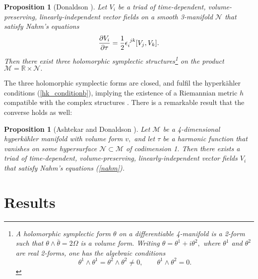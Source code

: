 \documentclass[a4paper,12pt, onecolumn, notitlepage]{article}
\newtheorem{prop}[thm]{Proposition}
\theoremstyle{definition}
\theoremstyle{remark}
\newcommand{\e}{\epsilon}
\newcommand{\ddt}[1]{\frac{\partial #1}{\partial \tau}}
\newcommand{\HK}{hyperk\"ahler }
\newcommand{\R}{\mathbb{R}}
\begin{document}
\begin{prop}[Donaldson \cite{donaldson}]
	Let $V_{i}$ be a triad of time-dependent, volume-preserving, linearly-independent vector fields on a smooth 3-manifold $\mathcal{N}$ that satisfy Nahm's equations
	$$\ddt{V_{i}} = \frac{1}{2}\e\indices{_i^j^k}[V_{j},V_{k}].
	$$
	Then there exist three holomorphic symplectic structures\footnote{A \emph{holomorphic symplectic form} $\theta$ on a differentiable 4-manifold is a 2-form such that $\theta\wedge\bar{\theta}=2\Omega$ is a volume form. Writing $\theta = \theta^{1} + i\theta^{2},$ where $\theta^{1}$ and $\theta^{2}$ are real 2-forms, one has the algebraic conditions
		\begin{equation*}
		\theta^{1}\wedge\theta^{1}=\theta^{2}\wedge\theta^{2}\neq 0,\qquad \theta^{1}\wedge \theta^{2}=0.
		\end{equation*}}
	 on the product $\mathcal{M}=\R\times\mathcal{N}.$ 
\end{prop}
The three holomorphic symplectic forms are closed, and fulfil the \HK conditions (\ref{hk_conditionb}), implying the existence of a Riemannian metric $h$ compatible with the complex structures \cite{donaldson}. There is a remarkable result that the converse holds as well:\\

\begin{prop}[Ashtekar \cite{ashtekar_1988} and Donaldson \cite{donaldson}]
	Let $\mathcal{M}$ be a 4-dimensional \HK manifold with volume form $v,$ and let $\tau$ be a harmonic function that vanishes on some hypersurface $\mathcal{N}\subset\mathcal{M}$ of codimension 1. Then there exists a triad of time-dependent, volume-preserving, linearly-independent vector fields $V_{i}$ that satisfy Nahm's equations (\ref{nahm}).
\end{prop}

\section{Results}
\end{document}
